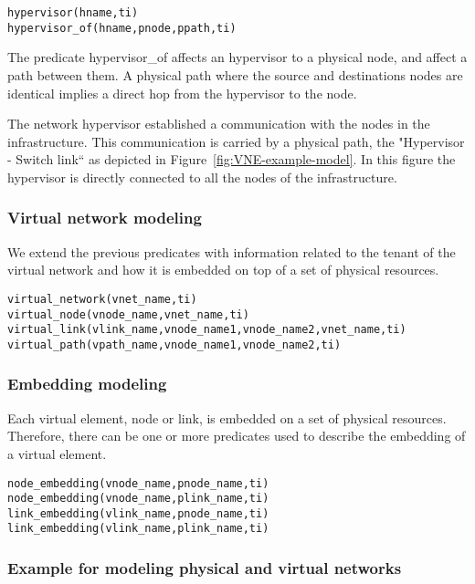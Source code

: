 \begin{lstlisting}[backgroundcolor = \color{lightgray}]
hypervisor(hname,ti)
hypervisor_of(hname,pnode,ppath,ti)
\end{lstlisting}

The predicate hypervisor\_of affects an hypervisor to a physical node, and affect a path between them.
A physical path where the source and destinations nodes are identical implies a direct hop from the hypervisor to the node.

The network hypervisor established a communication with the nodes in the infrastructure.
This communication is carried by a physical path, the "Hypervisor - Switch link`` as depicted in Figure~\ref{fig:VNE-example-model}.
In this figure the hypervisor is directly connected to all the nodes of the infrastructure.



\subsubsection{Virtual network modeling}
We extend the previous predicates with information related to the tenant of the virtual network and how it is embedded on top of a set of physical resources.


\begin{lstlisting}[backgroundcolor = \color{lightgray}]
virtual_network(vnet_name,ti)
virtual_node(vnode_name,vnet_name,ti)
virtual_link(vlink_name,vnode_name1,vnode_name2,vnet_name,ti)
virtual_path(vpath_name,vnode_name1,vnode_name2,ti)
\end{lstlisting}

\subsubsection{Embedding modeling}
Each virtual element, node or link, is embedded on a set of physical resources.
Therefore, there can be one or more predicates used to describe the embedding of a virtual element.

\begin{lstlisting}[backgroundcolor = \color{lightgray}]
node_embedding(vnode_name,pnode_name,ti)
node_embedding(vnode_name,plink_name,ti)
link_embedding(vlink_name,pnode_name,ti)
link_embedding(vlink_name,plink_name,ti)
\end{lstlisting}

\subsubsection{Example for modeling physical and virtual networks}

